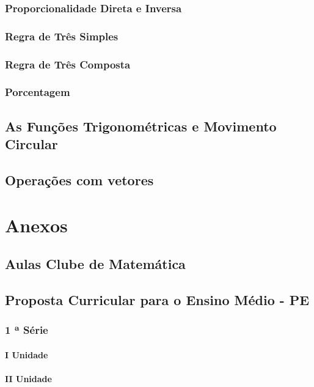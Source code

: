 \documentclass[12pt,a4paper]{book}
\begin{document}
	\section{Proporcionalidade Direta e Inversa}
	\section{Regra de Três Simples}
	\section{Regra de Três Composta}
	\section{Porcentagem}

\chapter{As Funções Trigonométricas e Movimento Circular}

\chapter{Operações com vetores}



\part{Anexos}
\chapter{Aulas Clube de Matemática}
\chapter{Proposta Curricular para o Ensino Médio - PE}
	\section{1 ª Série}
		\subsection{I Unidade}
		\subsection{II Unidade}
\end{document}
